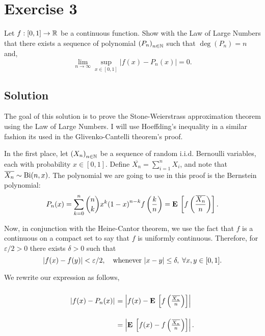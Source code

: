 \section{Exercise 3}
Let $f : [0,1]\to \mathbb{R}$ be a continuous function. Show with the Law of Large Numbers that there exists a sequence of polynomial ${(P_n)}_{n\in \mathbb{N}}$ such that $\deg(P_n) = n$ and,
\[ \lim_{n\to\infty} \sup_{x\in [0,1]} |f(x) - P_n(x)| = 0. \]

\subsection*{Solution}

The goal of this solution is to prove the Stone-Weierstrass approximation theorem using the Law of Large Numbers. I will use Hoeffding's inequality in a similar fashion its used in the Glivenko-Cantelli theorem's proof.

In the first place, let ${(X_n)}_{n\in \mathbb{N}}$ be a sequence of random i.i.d. Bernoulli variables, each with probability $x \in [0,1]$. Define $\overline{X_n} = \sum_{i = 1}^n X_i$, and note that $\overline{X_n} \sim \mathrm{Bi}(n,x)$. The polynomial we are going to use in this proof is the Bernstein polynomial:
\[ P_n(x) = \sum_{k = 0}^n \binom{n}{k} x^k {(1-x)}^{n-k} f\left(\frac{k}{n}\right) = \mathbf{E}\: \left[f\left( \frac{\overline{X_n}}{n} \right)\right].\]

Now, in conjunction with the Heine-Cantor theorem, we use the fact that $f$ is a continuous on a compact set to say that $f$ is uniformly continuous. Therefore, for $\varepsilon/2 > 0$ there exists $\delta > 0$ such that
\[ |f(x) - f(y)| < \varepsilon/2,\hspace*{1em} \text{whenever } |x-y| \leq \delta,\; \forall x,y\in[0,1]. \]

We rewrite our expression as follows,
\[ \everymath{\displaystyle}
\arraycolsep=1.8pt\def\arraystretch{2.8}
\begin{array}{rl}
    |f(x) - P_n(x)| & = \left|f(x) - \E \left[f\left( \tfrac{\overline{X_n}}{n} \right)\right]\right|\\

    & = \left|\E \left[f(x) - f\left( \tfrac{\overline{X_n}}{n} \right) \right]\right|.

\end{array}\]

